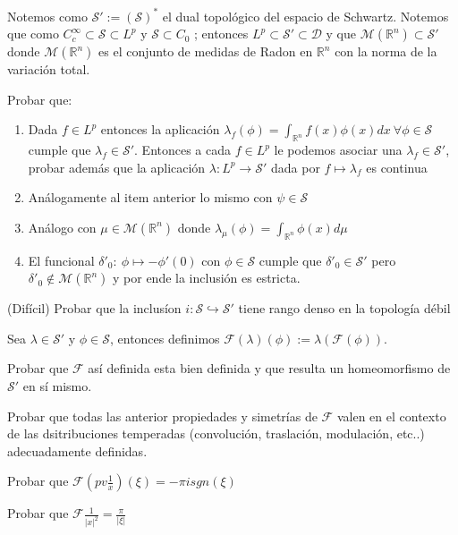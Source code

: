 \documentclass[11pt]{article}
\newcommand{\R}{{\mathbb{R}}}
\newenvironment{definition}[1][Definici\'on]{\begin{trivlist}
\item[\hskip \labelsep {\bfseries #1}]}{\end{trivlist}}
\newcommand{\F}{\mathcal{F}}
\newcommand{\inc}{\hookrightarrow}
\newcommand{\Sw}{\mathcal{S}}
\begin{document}
\begin{enumerate}
\begin{definition}
Notemos como $\Sw' := (\Sw)^*$ el dual topol\'ogico del espacio de Schwartz. Notemos que como $C^{\infty}_{c} \subset \Sw \subset L^p $ y $\Sw \subset C_0$ ; entonces $L^p \subset \Sw' \subset \mathcal{D}$ y que $\mathcal{M}(\R^n) \subset \Sw'$ donde $\mathcal{M}(\R^n)$ es el conjunto de medidas de Radon en $\R^n$ con la norma de la variaci\'on total.

\end{definition}

\item Probar que:

\begin{enumerate}

\item Dada $f \in L^p$ entonces la aplicaci\'on $\lambda_f (\phi) = \int_{\R^n}{f(x)\phi(x)dx} \ \forall \phi \in \Sw$ cumple que $\lambda_f \in \Sw'$. Entonces a cada $f \in L^p$ le podemos asociar una $\lambda_f \in \Sw'$, probar adem\'as que la aplicaci\'on $\lambda: L^p \rightarrow \Sw'$ dada por $f \mapsto \lambda_f$ es continua

\item An\'alogamente al item anterior lo mismo con $\psi \in \Sw$

\item An\'alogo con $\mu \in \mathcal{M}(\R^n)$ donde $\lambda_{\mu}(\phi) = \int_{\R^n}{\phi(x)d\mu}$

\item El funcional $\delta'_{0} : \ \phi \mapsto -\phi'(0)$ con $\phi \in \Sw$ cumple que $\delta'_{0} \in \Sw'$ pero $\delta'_{0} \not \in \mathcal{M}(\R^n)$ y por ende la inclusi\'on es estricta.

\end{enumerate}

\item (Dif\'icil) Probar que la inclus\'ion $i: \Sw \inc \Sw'$ tiene rango denso en la topolog\'ia d\'ebil

\begin{definition}

Sea $\lambda \in \Sw'$ y $\phi \in \Sw$, entonces definimos $\F(\lambda)(\phi) := \lambda(\F(\phi))$.

\end{definition}

\item Probar que $\F$ as\'i definida esta bien definida y que resulta un homeomorfismo de $\Sw'$ en s\'i mismo.

\item Probar que todas las anterior propiedades y simetr\'ias de $\F$ valen en el contexto de las dsitribuciones temperadas (convoluci\'on, traslaci\'on, modulaci\'on, etc..) adecuadamente definidas.

\item Probar que $\F(pv \frac{1}{x})(\xi) = -\pi i sgn(\xi)$

\item Probar que $\F \frac{1}{|x|^2} = \frac{\pi}{|\xi|}$

\end{enumerate}
\end{document}

